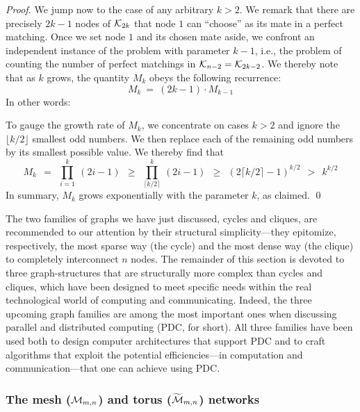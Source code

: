 \begin{proof}
We jump now to the case of any arbitrary $k > 2$.  We remark that
there are precisely $2k-1$ nodes of $\mbox{$\cal K$}_{2k}$ that node $1$ can
``choose'' as its mate in a perfect matching.  Once we set node $1$
and its chosen mate aside, we confront an independent instance of the
problem with parameter $k-1$, i.e., the problem of counting the number
of perfect matchings in $\mbox{$\cal K$}_{n-2} = \mbox{$\cal K$}_{2k-2}$.  We thereby note that
as $k$ grows, the quantity $M_k$ obeys the following recurrence:
\[ M_k \ = \ (2k-1) \cdot M_{k-1} \]
In other words:

\hspace*{.25in}{\em $M_k$ is the product of the first $k$ odd numbers.}

\noindent
To gauge the growth rate of $M_k$, we concentrate on cases $k > 2$ and
ignore the $\lfloor k/2 \rfloor$ smallest odd numbers.  We then
replace each of the remaining odd numbers by its smallest possible
value.  We thereby find that
\[
M_k \ \ =    \ \ \prod_{i=1}^k \ (2i-1)
    \ \ \geq \ \ \prod_{\lceil k/2 \rceil}^k \ (2i-1)
    \ \ \geq \ \ \left( 2 \lceil k/2 \rceil -1 \right)^{k/2}
    \ \ >    \ \ k^{k/2}
\]
In summary, $M_k$ grows exponentially with the parameter $k$, as claimed.
\qed
\end{proof}


\bigskip

The two families of graphs we have just discussed, cycles and cliques,
are recommended to our attention by their structural simplicity---they
epitomize, respectively, the most sparse way (the cycle) and the most
dense way (the clique) to completely interconnect $n$ nodes.  The
remainder of this section is devoted to three graph-structures that
are structurally more complex than cycles and cliques, which have been
designed to meet specific needs within the real technological world of
computing and communicating.  Indeed, the three upcoming graph
families are among the most important ones when discussing parallel
and distributed computing (PDC, for short).  All three families have
been used both to design computer architectures that support PDC and
to craft algorithms that exploit the potential efficiencies---in
computation and communication---that one can achieve using PDC.

\subsubsection{The mesh ($\mbox{$\cal M$}_{m,n}$) and torus ($\widetilde{\mbox{$\cal M$}}_{m,n}$) networks}
\label{sec:mesh-torus}

